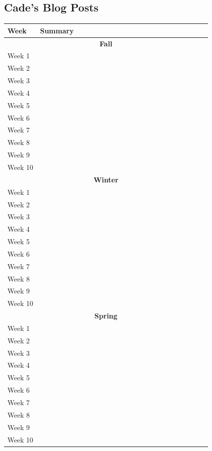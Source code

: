 \documentclass[onecolumn, draftclsnofoot,10pt, compsoc]{IEEEtran}
\begin{document}
\subsection{Cade's Blog Posts}
\begin{center}
	\begin{longtable}{| l | p{0.84\linewidth}|}
		\hline
	Week & Summary \\ \hline
    \multicolumn{2}{c}{\textbf{Fall}} \\ \hline
    Week 1 &  \\ \hline
	Week 2 &  \\ \hline
	Week 3 &  \\ \hline
	Week 4 &  \\ \hline
    Week 5 &  \\ \hline
    Week 6 &  \\ \hline
	Week 7 &  \\ \hline
	Week 8 &  \\ \hline
	Week 9 &  \\ \hline
    Week 10 & \\ \hline
    \multicolumn{2}{c}{\textbf{Winter}} \\ \hline
    Week 1 &  \\ \hline
	Week 2 &  \\ \hline
	Week 3 &  \\ \hline
	Week 4 &  \\ \hline
    Week 5 &  \\ \hline
    Week 6 &  \\ \hline
	Week 7 &  \\ \hline
	Week 8 &  \\ \hline
	Week 9 &  \\ \hline
    Week 10 & \\ \hline
    \multicolumn{2}{c}{\textbf{Spring}} \\ \hline
    Week 1 &  \\ \hline
	Week 2 &  \\ \hline
	Week 3 &  \\ \hline
	Week 4 &  \\ \hline
    Week 5 &  \\ \hline
    Week 6 &  \\ \hline
	Week 7 &  \\ \hline
	Week 8 &  \\ \hline
	Week 9 &  \\ \hline
    Week 10 & \\ \hline
\end{longtable}
\end{center}
\end{document}
